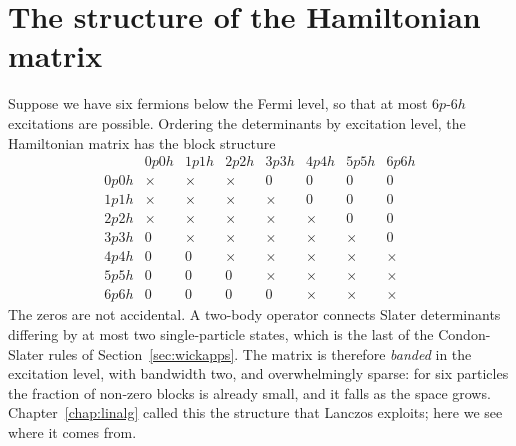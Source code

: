 \section{The structure of the Hamiltonian matrix}
\label{sec:cimatrix}

Suppose we have six fermions below the Fermi level, so that at most
$6p$-$6h$ excitations are possible.  Ordering the determinants by excitation
level, the Hamiltonian matrix has the block structure
\begin{equation}
  \begin{array}{c|ccccccc}
     & 0p0h & 1p1h & 2p2h & 3p3h & 4p4h & 5p5h & 6p6h\\
    \hline
    0p0h & \times & \times & \times & 0 & 0 & 0 & 0\\
    1p1h & \times & \times & \times & \times & 0 & 0 & 0\\
    2p2h & \times & \times & \times & \times & \times & 0 & 0\\
    3p3h & 0 & \times & \times & \times & \times & \times & 0\\
    4p4h & 0 & 0 & \times & \times & \times & \times & \times\\
    5p5h & 0 & 0 & 0 & \times & \times & \times & \times\\
    6p6h & 0 & 0 & 0 & 0 & \times & \times & \times
  \end{array}
  \label{eq:5-blockstructure}
\end{equation}
The zeros are not accidental.  A two-body operator connects Slater
determinants differing by at most two single-particle states, which is the
last of the Condon-Slater rules of Section~\ref{sec:wickapps}.  The matrix is
therefore \emph{banded} in the excitation level, with bandwidth two, and
overwhelmingly sparse: for six particles the fraction of non-zero blocks is
already small, and it falls as the space grows.  Chapter~\ref{chap:linalg}
called this the structure that Lanczos exploits; here we see where it comes
from.

